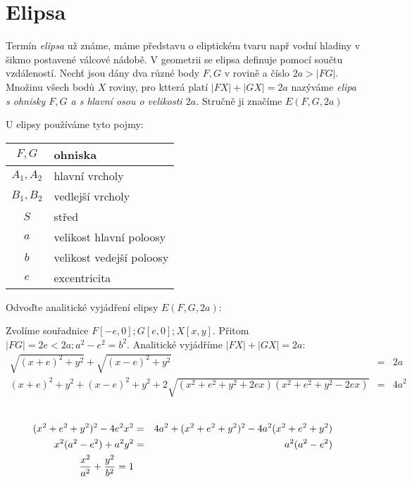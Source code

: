 
\BeginDoc{}
\section{Elipsa}
\Poz
Termín \emph{elipsa} už známe, máme představu o eliptickém tvaru např vodní hladiny v šikmo postavené válcové nádobě.
V geometrii se elipsa definuje pomocí součtu vzdáleností.
\Def Nechť jsou dány dva různé body $F,G$ v rovině a číslo $2a > |FG|$.
Množinu všech bodů $X$ roviny, pro ktterá platí $|FX| + |GX| = 2a$ nazýváme \emph{elipa s ohnisky $F,G$ a s hlavní osou o velikosti $2a$.}
Stručně ji značíme $E(F,G,2a)$

\Def
U elipsy používáme tyto pojmy:\\
\begin{minipage}{0.5\textwidth}
	\begin{tabular}{|c|l|}\hline
		$F,G$ & ohniska \\\hline
		$A_1,A_2$ & hlavní vrcholy \\\hline
		$B_1,B_2$ & vedlejší vrcholy \\\hline
		$S$ & střed \\\hline
		$a$ & velikost hlavní poloosy \\\hline
		$b$ & velikost vedejší poloosy \\\hline
		$e$ & excentricita \\\hline
	\end{tabular}
\end{minipage}
\begin{minipage}{0.5\textwidth}
\end{minipage}

\Pr Odvoďte analitické vyjádření elipsy $E(F,G,2a)$:

Zvolíme souřadnice $F[-e,0];G[e,0];X[x,y]$.
Přitom $|FG| = 2e < 2a; a^2 - e^2 = b^2$.
Analitické vyjádříme $|FX| + |GX| = 2a$:
\begin{eqnarray*}
	\sqrt{(x+e)^2+y^2} +\sqrt{(x-e)^2+y^2} &=& 2a\\
	{(x+e)^2+y^2} +{(x-e)^2+y^2} + 2 \sqrt{(x^2+e^2 + y^2 +2ex)(x^2+e^2 + y^2 -2ex)} &=& 4a^2\\
\end{eqnarray*}\\[-53px]
\begin{eqnarray*}
	(x^2 + e^2 + y^2)^2 - 4 e^2 x^2 &=& 4a^2 + (x^2 + e^2 + y^2)^2 - 4a^2 (x^2 + e^2 + y^2)\\
	x^2(a^2-e^2) + a^2 y^2 &=& a^2 (a^2 - e^2)\\
	\frac{x^2}{a^2} + \frac{y^2}{b^2} = 1 
\end{eqnarray*}

